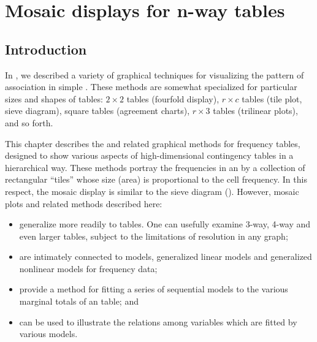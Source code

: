 \documentclass[10pt,krantz2]{krantz}\usepackage[]{graphicx}\usepackage[]{color}
\begin{document}


\chapter{Mosaic displays for n-way tables}\label{ch:mosaic}


\section{Introduction}\label{sec:mosaic-intro}


In , we described a variety of graphical techniques
for visualizing the pattern of association in simple \ctabs.
These methods are somewhat specialized for particular
sizes and shapes of tables:
$2 \times 2$ tables (fourfold display),
$r \times c$ tables (tile plot, sieve diagram),
square tables (agreement charts),
$r \times 3$ tables (trilinear plots), and so forth.

This chapter describes the
 and related graphical methods
for \nway frequency tables, designed to show
various aspects of high-dimensional contingency tables in a hierarchical way.
These methods portray the
frequencies in an \nway
\ctab  by a collection of rectangular ``tiles''
whose size (area) is proportional to the cell frequency.
In this respect, the mosaic display is similar to the sieve diagram ().
However, mosaic plots and related methods described here:
\begin{itemize}
\item generalize more readily to \nway tables.  One can usefully examine
3-way, 4-way and even larger tables, subject to the limitations
of resolution in any graph;
\item are intimately connected to \loglin models, generalized linear models
and generalized nonlinear models for frequency data;
\item provide a method for fitting a series of sequential \loglin
models to the various marginal totals of an \nway table; and
\item can be used to illustrate the relations among variables which
are fitted by various \loglin models.
\end{itemize}
\end{document}
